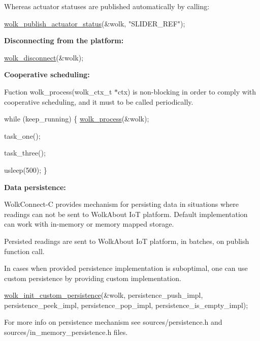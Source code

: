 Whereas actuator statuses are published automatically by calling\+: 
\begin{DoxyCode}
\hyperlink{wolk__connector_8h_aa510c9f8df1d095d4e1aef9b7fdaf600}{wolk\_publish\_actuator\_status}(&wolk, \textcolor{stringliteral}{"SLIDER\_REF"});
\end{DoxyCode}


{\bfseries Disconnecting from the platform\+:} 
\begin{DoxyCode}
\hyperlink{wolk__connector_8h_af174943365b8cddc1e6e9351996805c3}{wolk\_disconnect}(&wolk);
\end{DoxyCode}


{\bfseries Cooperative scheduling\+:}

Fuction {\ttfamily wolk\+\_\+process(wolk\+\_\+ctx\+\_\+t $\ast$ctx)} is non-\/blocking in order to comply with cooperative scheduling, and it must to be called periodically.


\begin{DoxyCode}
\textcolor{keywordflow}{while} (keep\_running)
\{
    \hyperlink{wolk__connector_8h_a57a05d76cc96bc5de0ee0e9a23ca5a8e}{wolk\_process}(&wolk);

    task\_one();

    task\_three();

    usleep(500);
\}
\end{DoxyCode}


{\bfseries Data persistence\+:}

Wolk\+Connect-\/C provides mechanism for persisting data in situations where readings can not be sent to Wolk\+About IoT platform. Default implementation can work with in-\/memory or memory mapped storage.

Persisted readings are sent to Wolk\+About IoT platform, in batches, on publish function call.

In cases when provided persistence implementation is suboptimal, one can use custom persistence by providing custom implementation.


\begin{DoxyCode}
\hyperlink{wolk__connector_8h_a4cb5cc0164b0ab19f9b2bf36d28e9913}{wolk\_init\_custom\_persistence}(&wolk,
                             persistence\_push\_impl,
                             persistence\_peek\_impl, persistence\_pop\_impl,
                             persistence\_is\_empty\_impl);
\end{DoxyCode}


For more info on persistence mechanism see {\ttfamily sources/persistence.\+h} and {\ttfamily sources/in\+\_\+memory\+\_\+persistence.\+h} files.

